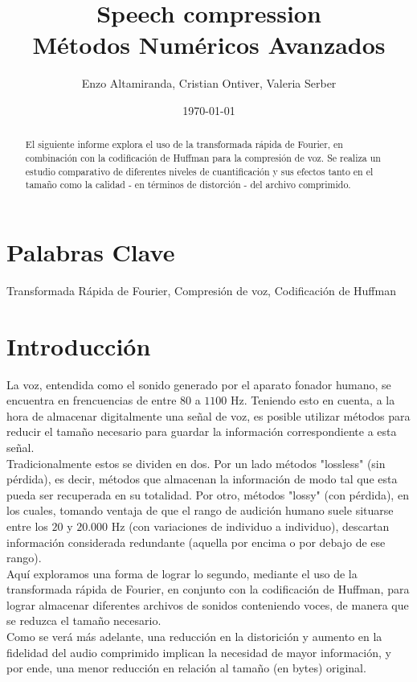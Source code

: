 \documentclass[a4paper,11pt]{article}
\title{Speech compression \\
M\'etodos Num\'ericos Avanzados}
\author{Enzo Altamiranda, Cristian Ontiver, Valeria Serber}
\date{\today}
\begin{document}
\maketitle
\thispagestyle{empty}
\vspace{3cm}

\renewcommand{\abstractname}{Resumen}
\begin{abstract}
El siguiente informe explora el uso de la transformada rápida de Fourier, en
combinación con la codificación de Huffman para la compresión de voz. Se
realiza un estudio comparativo de diferentes niveles de cuantificación y sus
efectos tanto en el tamaño como la calidad - en términos de distorción - del
archivo comprimido.
\end{abstract}
\section*{Palabras Clave}
Transformada Rápida de Fourier, Compresión de voz, Codificación de Huffman
\newpage
\section{Introducci\'on}

La voz, entendida como el sonido generado por el aparato fonador humano, se
encuentra en frencuencias de entre $80$ a $1100$ Hz.  Teniendo esto en cuenta,
a la hora de almacenar digitalmente una señal de voz, es posible utilizar
métodos para reducir el tamaño necesario para guardar la información
correspondiente a esta señal.\\
Tradicionalmente estos se dividen en dos. Por un lado métodos "lossless" (sin
pérdida), es decir, métodos que almacenan la información de modo tal que esta
pueda ser recuperada en su totalidad. Por otro, métodos "lossy" (con pérdida),
en los cuales, tomando ventaja de que el rango de audición humano suele
situarse entre los $20$ y $20.000$ Hz (con variaciones de individuo a
individuo), descartan información considerada redundante (aquella por encima o
por debajo de ese rango).\\
Aquí exploramos una forma de lograr lo segundo, mediante el uso de la
transformada rápida de Fourier, en conjunto con la codificación de Huffman,
para lograr almacenar diferentes archivos de sonidos conteniendo voces, de
manera que se reduzca el tamaño necesario.\\
Como se verá más adelante, una reducción en la distorición y aumento en la
fidelidad del audio comprimido implican la necesidad de mayor información, y
por ende, una menor reducción en relación al tamaño (en bytes) original.
\end{document}
